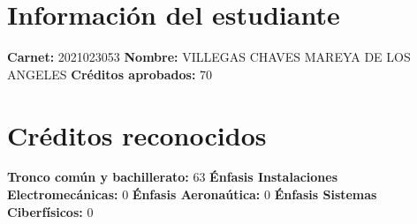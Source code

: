 \documentclass[letterpaper]{article}%
\begin{document}
%
\normalsize%
\section*{Información del estudiante}%
\label{sec:Informacindelestudiante}%
\textbf{Carnet: }%
2021023053%
\newline%
\textbf{Nombre: }%
VILLEGAS CHAVES MAREYA DE LOS ANGELES%
\newline%
\textbf{Créditos aprobados: }%
70

%
\section*{Créditos reconocidos}%
\label{sec:Crditosreconocidos}%
\textbf{Tronco común y bachillerato: }%
63%
\newline%
\textbf{Énfasis Instalaciones Electromecánicas: }%
0%
\newline%
\textbf{Énfasis Aeronaútica: }%
0%
\newline%
\textbf{Énfasis Sistemas Ciberfísicos: }%
0

%
\end{document}
